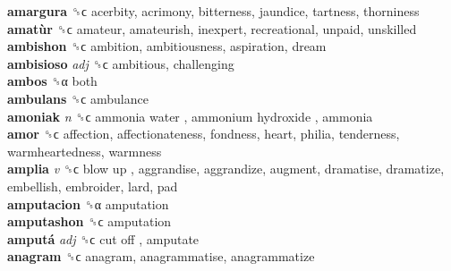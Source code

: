 \textbf{amargura} ␝ϲ  acerbity, acrimony, bitterness, jaundice, tartness, thorniness  \\
\textbf{amatùr} ␝ϲ  amateur, amateurish, inexpert, recreational, unpaid, unskilled  \\
\textbf{ambishon} ␝ϲ  ambition, ambitiousness, aspiration, dream  \\
\textbf{ambisioso} \emph{adj}  ␝ϲ  ambitious, challenging  \\
\textbf{ambos} ␝α  both  \\
\textbf{ambulans} ␝ϲ  ambulance  \\
\textbf{amoniak} \emph{n}  ␝ϲ   ammonia water ,  ammonium hydroxide , ammonia  \\
\textbf{amor} ␝ϲ  affection, affectionateness, fondness, heart, philia, tenderness, warmheartedness, warmness  \\
\textbf{amplia} \emph{v}  ␝ϲ   blow up , aggrandise, aggrandize, augment, dramatise, dramatize, embellish, embroider, lard, pad  \\
\textbf{amputacion} ␝α  amputation  \\
\textbf{amputashon} ␝ϲ  amputation  \\
\textbf{amputá} \emph{adj}  ␝ϲ   cut off , amputate  \\
\textbf{anagram} ␝ϲ  anagram, anagrammatise, anagrammatize  \\
